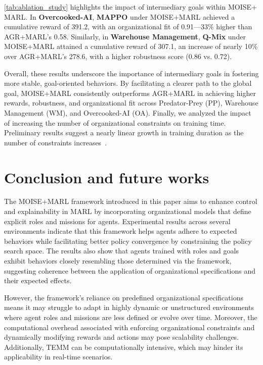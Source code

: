 \documentclass[sigconf]{aamas}
\begin{document}
\noindent \autoref{tab:ablation_study} highlights the impact of intermediary goals within MOISE+ MARL. In \textbf{Overcooked-AI}, \textbf{MAPPO} under MOISE+MARL achieved a cumulative reward of 391.2, with an organizational fit of 0.91—33\% higher than AGR+MARL's 0.58. Similarly, in \textbf{Warehouse Management}, \textbf{Q-Mix} under MOISE+MARL attained a cumulative reward of 307.1, an increase of nearly 10\% over AGR+MARL's 278.6, with a higher robustness score (0.86 vs. 0.72).

Overall, these results underscore the importance of intermediary goals in fostering more stable, goal-oriented behaviors. By facilitating a clearer path to the global goal, MOISE+MARL consistently outperforms AGR+MARL in achieving higher rewards, robustness, and organizational fit across Predator-Prey (PP), Warehouse Management (WM), and Overcooked-AI (OA).
Finally, we analyzed the impact of increasing the number of organizational constraints on training time. Preliminary results suggest a nearly linear growth in training duration as the number of constraints increases~\footnotemark[1].

\section{Conclusion and future works}
\label{sec:discussion_conclusion_future_work}

The MOISE+MARL framework introduced in this paper aims to enhance control and explainability in MARL by incorporating organizational models that define explicit roles and missions for agents. Experimental results across several environments indicate that this framework helps agents adhere to expected behaviors while facilitating better policy convergence by constraining the policy search space. The results also show that agents trained with roles and goals exhibit behaviors closely resembling those determined via the framework, suggesting coherence between the application of organizational specifications and their expected effects.

However, the framework's reliance on predefined organizational specifications means it may struggle to adapt in highly dynamic or unstructured environments where agent roles and missions are less defined or evolve over time.
Moreover, the computational overhead associated with enforcing organizational constraints and dynamically modifying rewards and actions may pose scalability challenges. Additionally, TEMM can be computationally intensive, which may hinder its applicability in real-time scenarios.
\end{document}

